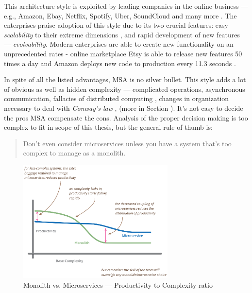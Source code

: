 \documentclass[thesis=M,english,hidelinks]{FITthesis}[2012/10/20]
\begin{document}
This architecture style is exploited by leading companies in the online business --- e.g., Amazon, Ebay, Netflix, Spotify, Uber, SoundCloud and many more \cite{ms-who-is-using}. The enterprises praise adoption of this style due to its two crucial features: easy \textit{scalability} to their extreme dimensions \cite{ms-ebay-scalability-best-practices, ms-ebay-ds-scalability, ms-spotify-horizontal-scaling, ms-spotify}, and rapid development of new features --- \textit{evolvability}. Modern enterprises are able to create new functionality on an unprecedented rates - online marketplace Etsy is able to release new features 50 times a day and Amazon deploys new code to production every 11.3 seconds \cite{devops-deploying-hourly}.


In spite of all the listed advantages, \acrlong{MSA} is no silver bullet. This style adds a lot of obvious as well as hidden complexity --- complicated operations, asynchronous communication, fallacies of distributed computing \cite{devops-fallacies}, changes in organization necessary to deal with \textit{Conway's law} \cite{conways-law}, (more in Section ). It's not easy to decide the pros \acrshort{MSA} compensate the cons. Analysis of the proper decision making is too complex to fit in scope of this thesis, but the general rule of thumb is:
\begin{quote}
    Don't even consider microservices unless you have a system that's too complex to manage as a monolith.~\cite{ms-fow-monolith-first}
\end{quote}

\begin{figure}
  \centering
    \includegraphics[width=0.7\textwidth]{images/microservices_productivity.png}
    \caption{Monolith vs. Microservices --- Productivity to Complexity ratio~\cite{ms-fow-monolith-first}}
    \label{fig:microservices_productivity}
\end{figure}
\end{document}

